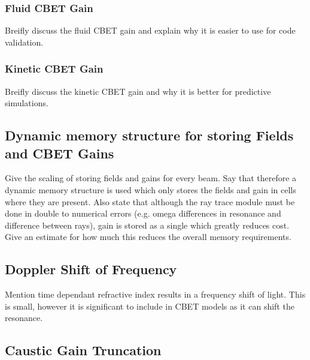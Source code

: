 \subsubsection{Fluid CBET Gain}

Breifly discuss the fluid CBET gain and explain why it is easier to use for code validation.

\subsubsection{Kinetic CBET Gain}

Breifly discuss the kinetic CBET gain and why it is better for predictive simulations.

\subsection{Dynamic memory structure for storing Fields and CBET Gains}

Give the scaling of storing fields and gains for every beam.
Say that therefore a dynamic memory structure is used which only stores the fields and gain in cells where they are present.
Also state that although the ray trace module must be done in double to numerical errors (e.g. omega differences in resonance and difference between rays), gain is stored as a single which greatly reduces cost.
Give an estimate for how much this reduces the overall memory requirements.

\subsection{Doppler Shift of Frequency}%
\label{sec:SOLAS_doppler}

Mention time dependant refractive index results in a frequency shift of light.
This is small, however it is significant to include in CBET models as it can shift the resonance.

\subsection{Caustic Gain Truncation}

